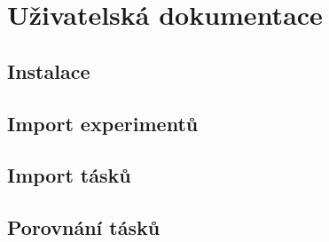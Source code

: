 \chapter{Uživatelská dokumentace}
\section{Instalace}
\section{Import experimentů}
\section{Import tásků}
\section{Porovnání tásků}
